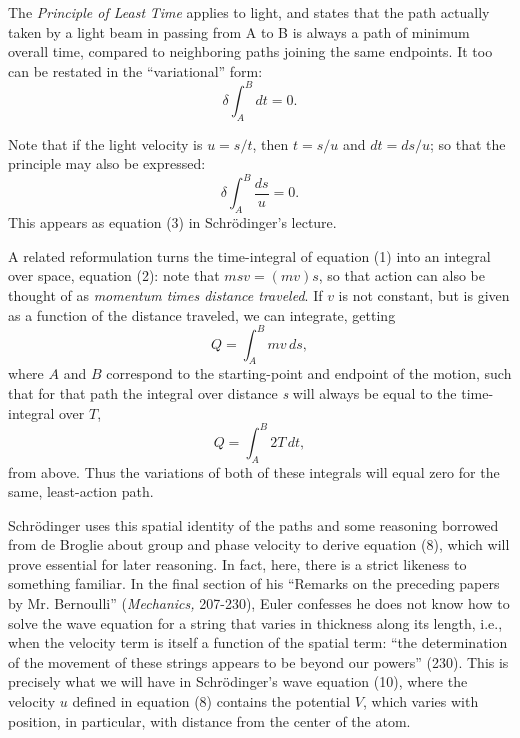 The \emph{Principle of Least} \emph{Time} applies to light, and
states that the path actually taken by a light beam in passing from A to
B is always a path of minimum overall time, compared to neighboring
paths joining the same endpoints. It too can be restated in the
``variational'' form:
\begin{equation*}
\delta \int_{A}^{B} \! dt = 0.
\end{equation*}

Note that if the light velocity is $u = s/t$, then
$t = s/u$ and $dt = ds/u$; so that the principle may also be expressed:
\begin{equation*}
\delta \int_{A}^{B} \! \frac{ds}{u} = 0.
\end{equation*}
This appears as equation (3) in Schrödinger's lecture.

A related reformulation turns the time-integral of equation (1) into
an integral over space, equation (2): note that $msv = (mv)s$, so that action can
also be thought of as \emph{momentum times distance traveled}. If
$v$ is not constant, but is given as a function of the distance
traveled, we can integrate, getting
\begin{equation*}
Q = \int_{A}^{B} \! mv\,ds ,
\end{equation*}
where $A$ and $B$ correspond to the starting-point and endpoint of the motion,
such that for that path the integral over distance \emph{s} will always
be equal to the time-integral over $T$,
\begin{equation*}
Q = \int_{A}^{B} \! 2T\,dt ,
\end{equation*}
from above. Thus the variations of both of these integrals will equal
zero for the same, least-action path.

Schrödinger uses this spatial identity of the paths and some reasoning
borrowed from de Broglie about group and phase velocity to derive equation
(8), which will prove essential for later reasoning. In fact, here, there
is a strict likeness to something familiar. In the final section of his
``Remarks on the preceding papers by Mr. Bernoulli'' (\emph{Mechanics,} 207-230),
Euler confesses he does not know how to solve the wave equation for a string
that varies in thickness along its length, i.e., when the velocity term is itself 
a function of the spatial term: ``the determination of the movement of these strings appears to be
beyond our powers'' (230). This is precisely what we will have in Schrödinger's
wave equation (10), where the velocity $u$ defined in equation (8) contains 
the potential $V$, which varies with position, in particular, with distance from
the center of the atom.

